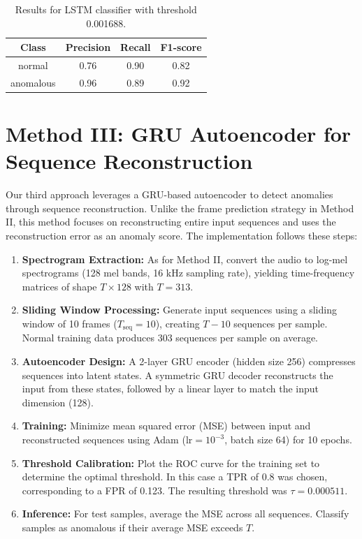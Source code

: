 \documentclass[ngerman]{scrartcl}
\begin{document}
\begin{table}[h]
    \centering
    \begin{tabular}{|c|c|c|c|}
        \hline
        Class & Precision & Recall & F1-score \\
        \hline
        normal  & 0.76  & 0.90   & 0.82   \\
        anomalous  & 0.96  & 0.89  & 0.92  \\
        \hline
    \end{tabular}
    \caption{Results for LSTM classifier with threshold 0.001688.}
    \label{tab:results}
\end{table}

\section{Method III: GRU Autoencoder for Sequence Reconstruction}

Our third approach leverages a GRU-based autoencoder to detect anomalies through sequence reconstruction. Unlike the frame prediction strategy in Method II, this method focuses on reconstructing entire input sequences and uses the reconstruction error as an anomaly score. The implementation follows these steps:

\begin{enumerate}
  \item \textbf{Spectrogram Extraction:} As for Method II, convert the audio to log-mel spectrograms (128 mel bands, 16 kHz sampling rate), yielding time-frequency matrices of shape \(T \times 128\) with \(T=313\).
  \item \textbf{Sliding Window Processing:} Generate input sequences using a sliding window of 10 frames (\(T_{\text{seq}} = 10\)), creating \(T - 10\) sequences per sample. Normal training data produces \(303\) sequences per sample on average.
  \item \textbf{Autoencoder Design:} A 2-layer GRU encoder (hidden size 256) compresses sequences into latent states. A symmetric GRU decoder reconstructs the input from these states, followed by a linear layer to match the input dimension (128).
  \item \textbf{Training:} Minimize mean squared error (MSE) between input and reconstructed sequences using Adam (\(\text{lr} = 10^{-3}\), batch size 64) for 10 epochs.
  \item \textbf{Threshold Calibration:} Plot the ROC curve for the training set to determine the optimal threshold. In this case a TPR of 0.8 was chosen, corresponding to a FPR of 0.123. The resulting threshold was \(\tau = 0.000511\).
  \item \textbf{Inference:} For test samples, average the MSE across all sequences. Classify samples as anomalous if their average MSE exceeds \(T\).
\end{enumerate}
\end{document}
